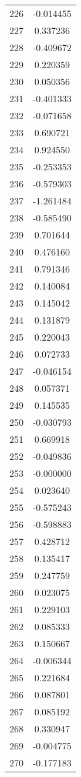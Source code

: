 \documentclass[12pt]{article}
\begin{document}
\begin{longtable}{@{}cc@{}}
226 & -0.014455 \\
227 & 0.337236 \\
228 & -0.409672 \\
229 & 0.220359 \\
230 & 0.050356 \\
231 & -0.401333 \\
232 & -0.071658 \\
233 & 0.690721 \\
234 & 0.924550 \\
235 & -0.253353 \\
236 & -0.579303 \\
237 & -1.261484 \\
238 & -0.585490 \\
239 & 0.701644 \\
240 & 0.476160 \\
241 & 0.791346 \\
242 & 0.140084 \\
243 & 0.145042 \\
244 & 0.131879 \\
245 & 0.220043 \\
246 & 0.072733 \\
247 & -0.046154 \\
248 & 0.057371 \\
249 & 0.145535 \\
250 & -0.030793 \\
251 & 0.669918 \\
252 & -0.049836 \\
253 & -0.000000 \\
254 & 0.023640 \\
255 & -0.575243 \\
256 & -0.598883 \\
257 & 0.428712 \\
258 & 0.135417 \\
259 & 0.247759 \\
260 & 0.023075 \\
261 & 0.229103 \\
262 & 0.085333 \\
263 & 0.150667 \\
264 & -0.006344 \\
265 & 0.221684 \\
266 & 0.087801 \\
267 & 0.085192 \\
268 & 0.330947 \\
269 & -0.004775 \\
270 & -0.177183 \\

\end{longtable}
\end{document}
